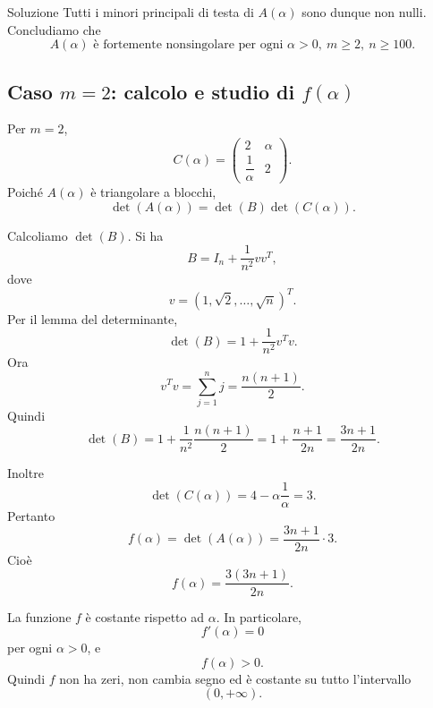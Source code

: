 \documentclass[a4paper]{article}
\begin{document}
\begin{snippetsolution}{Soluzione}
    Tutti i minori principali di testa di \(A(\alpha)\) sono dunque non nulli. Concludiamo che
    \[
        \boxed{
            A(\alpha) \text{ è fortemente nonsingolare per ogni } \alpha>0,\ m\geq 2,\ n\geq 100.
        }
    \]

    \subsection*{Caso \(m=2\): calcolo e studio di \(f(\alpha)\)}

    Per \(m=2\),
    \[
        C(\alpha)=
        \begin{pmatrix}
            2 & \alpha\\[2pt]
            \dfrac{1}{\alpha} & 2
        \end{pmatrix}.
    \]
    Poiché \(A(\alpha)\) è triangolare a blocchi,
    \[
        \det(A(\alpha))=\det(B)\det(C(\alpha)).
    \]

    Calcoliamo \(\det(B)\). Si ha
    \[
        B=I_n+\frac{1}{n^2}vv^T,
    \]
    dove
    \[
        v=(1,\sqrt{2},\dots,\sqrt{n})^T.
    \]
    Per il lemma del determinante,
    \[
        \det(B)=1+\frac{1}{n^2}v^Tv.
    \]
    Ora
    \[
        v^Tv=\sum_{j=1}^n j=\frac{n(n+1)}{2}.
    \]
    Quindi
    \[
        \det(B)
        =
        1+\frac{1}{n^2}\frac{n(n+1)}{2}
        =
        1+\frac{n+1}{2n}
        =
        \frac{3n+1}{2n}.
    \]

    Inoltre
    \[
        \det(C(\alpha))
        =
        4-\alpha\frac{1}{\alpha}
        =
        3.
    \]
    Pertanto
    \[
        f(\alpha)=\det(A(\alpha))
        =
        \frac{3n+1}{2n}\cdot 3.
    \]
    Cioè
    \[
        \boxed{
            f(\alpha)=\frac{3(3n+1)}{2n}.
        }
    \]

    La funzione \(f\) è costante rispetto ad \(\alpha\). In particolare,
    \[
        f'(\alpha)=0
    \]
    per ogni \(\alpha>0\), e
    \[
        f(\alpha)>0.
    \]
    Quindi \(f\) non ha zeri, non cambia segno ed è costante su tutto l'intervallo
    \[
        (0,+\infty).
    \]
\end{snippetsolution}
\end{document}
